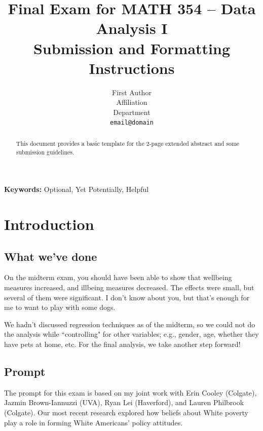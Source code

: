 \documentclass{article}\usepackage[]{graphicx}\usepackage[]{color}
\begin{document}
\vspace{-1in}
\title{Final Exam for MATH 354 -- Data Analysis I \\
Submission and Formatting Instructions}

\author{
  First Author \\
  Affiliation  \\
  Department  \\
  {\tt email@domain}
}

\date{}

\maketitle

\begin{multicols}{2}
\begin{abstract}
This document provides a basic template for the 2-page extended abstract and some submission guidelines.
\end{abstract}

{\bf Keywords:} Optional, Yet Potentially, Helpful




\section{Introduction}
\subsection{What we've done}
On the midterm exam, you should have been able to show that wellbeing measures increased, and illbeing measures decreased. The effects were small, but several of them were significant. I don't know about you, but that's enough for me to want to play with some dogs.

We hadn't discussed regression techniques as of the midterm, so we could not do the analysis while ``controlling" for other variables; e.g., gender, age, whether they have pets at home, etc. For the final analysis, we take another step forward!

\subsection{Prompt}
The prompt for this exam is based on my joint work with Erin Cooley (Colgate), Jazmin Brown-Iannuzzi (UVA), Ryan Lei (Haverford), and Lauren Philbrook (Colgate). Our most recent research explored how beliefs about White poverty play a role in forming White Americans' policy attitudes.


\end{multicols}
\end{document}

